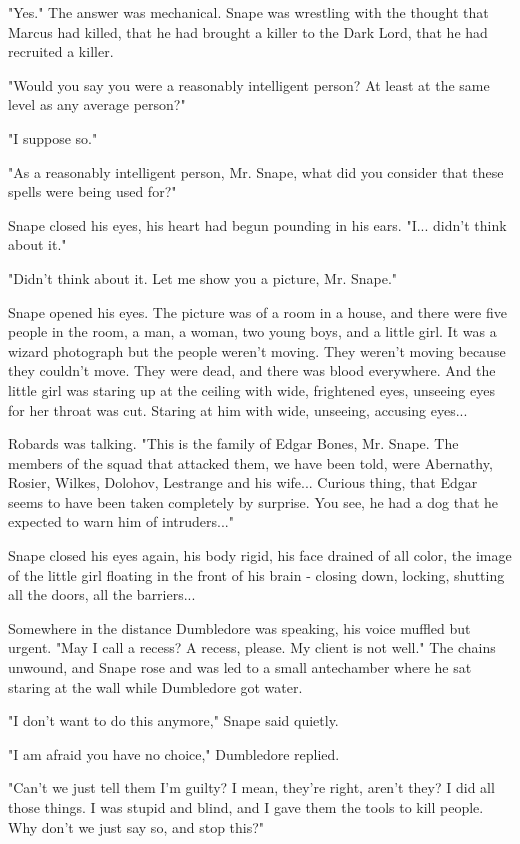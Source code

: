 \documentclass[a4paper,11pt]{article}
\begin{document}
"Yes." The answer was mechanical. Snape was wrestling with the thought that Marcus had killed, that he had brought a killer to the Dark Lord, that he had recruited a killer.

"Would you say you were a reasonably intelligent person? At least at the same level as any average person?"

"I suppose so."

"As a reasonably intelligent person, Mr. Snape, what did you consider that these spells were being used for?"

Snape closed his eyes, his heart had begun pounding in his ears. "I... didn't think about it."

"Didn't think about it. Let me show you a picture, Mr. Snape."

Snape opened his eyes. The picture was of a room in a house, and there were five people in the room, a man, a woman, two young boys, and a little girl. It was a wizard photograph but the people weren't moving. They weren't moving because they couldn't move. They were dead, and there was blood everywhere. And the little girl was staring up at the ceiling with wide, frightened eyes, unseeing eyes for her throat was cut. Staring at him with wide, unseeing, accusing eyes...

Robards was talking. "This is the family of Edgar Bones, Mr. Snape. The members of the squad that attacked them, we have been told, were Abernathy, Rosier, Wilkes, Dolohov, Lestrange and his wife... Curious thing, that Edgar seems to have been taken completely by surprise. You see, he had a dog that he expected to warn him of intruders..."

Snape closed his eyes again, his body rigid, his face drained of all color, the image of the little girl floating in the front of his brain - closing down, locking, shutting all the doors, all the barriers...

Somewhere in the distance Dumbledore was speaking, his voice muffled but urgent. "May I call a recess? A recess, please. My client is not well." The chains unwound, and Snape rose and was led to a small antechamber where he sat staring at the wall while Dumbledore got water.

"I don't want to do this anymore," Snape said quietly.

"I am afraid you have no choice," Dumbledore replied.

"Can't we just tell them I'm guilty? I mean, they're right, aren't they? I did all those things. I was stupid and blind, and I gave them the tools to kill people. Why don't we just say so, and stop this?"
\end{document}
